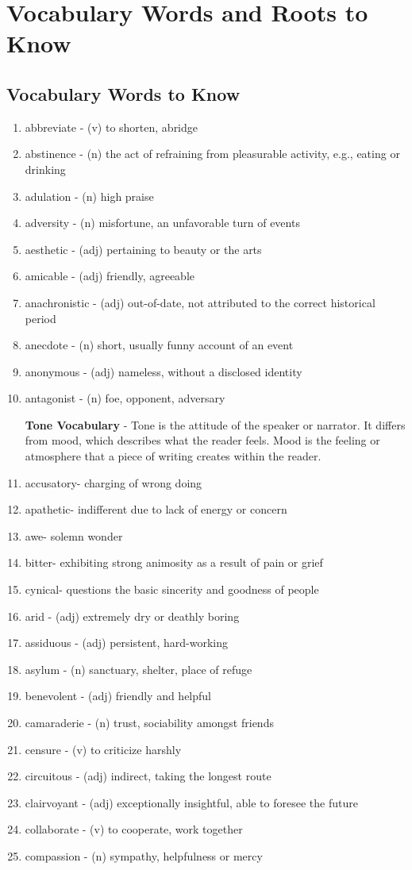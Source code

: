 \chapter[Vocabulary Words]{Vocabulary Words and Roots to Know}
\section{Vocabulary Words to Know}

\begin{enumerate}
\item abbreviate - (v) to shorten, abridge
\item abstinence - (n) the act of refraining from pleasurable activity, e.g., eating or drinking
\item adulation - (n) high praise
\item adversity - (n) misfortune, an unfavorable turn of events
\item aesthetic - (adj) pertaining to beauty or the arts
\item amicable - (adj) friendly, agreeable
\item anachronistic - (adj) out-of-date, not attributed to the correct historical period
\item anecdote - (n) short, usually funny account of an event
\item anonymous - (adj) nameless, without a disclosed identity
\item antagonist - (n) foe, opponent, adversary

\bigskip
\textbf{Tone Vocabulary} - Tone is the attitude of the speaker or narrator.  It differs from mood, which describes what the reader feels.  Mood is the feeling or atmosphere that a piece of writing creates within the reader.  

\bigskip
\item accusatory- charging of wrong doing
\item apathetic- indifferent due to lack of energy or concern
\item awe- solemn wonder
\item bitter- exhibiting strong animosity as a result of pain or grief
\item cynical- questions the basic sincerity and goodness of people

\bigskip
\item arid - (adj) extremely dry or deathly boring
\item assiduous - (adj) persistent, hard-working
\item asylum - (n) sanctuary, shelter, place of refuge
\item benevolent - (adj) friendly and helpful
\item camaraderie - (n) trust, sociability amongst friends
\item censure - (v) to criticize harshly
\item circuitous - (adj) indirect, taking the longest route
\item clairvoyant - (adj) exceptionally insightful, able to foresee the future
\item collaborate - (v) to cooperate, work together
\item compassion - (n) sympathy, helpfulness or mercy


\end{enumerate}
